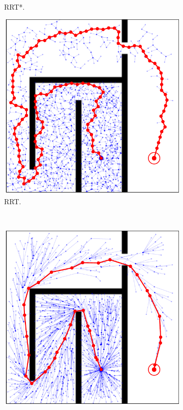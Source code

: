 \documentclass{ctuthesis}
\begin{document}
\begin{figure}[!ht]
\begin{subfigure}[b]{0.45\textwidth}
      \caption{RRT*.}
      \label{fig:rrtstar2k}
  \end{subfigure}  
  \begin{subfigure}[b]{0.45\textwidth}
      \includegraphics[width=\textwidth]{figChap3/RRT_maze7748i119w.pdf}
      \caption{RRT.}
      \label{fig:rrtMaze}
  \end{subfigure}
  ~ %
  \begin{subfigure}[b]{0.45\textwidth}
      \includegraphics[width=\textwidth]{figChap3/RRTstar_maze_7060i_35w.pdf}

\end{subfigure}
\end{figure}
\end{document}
